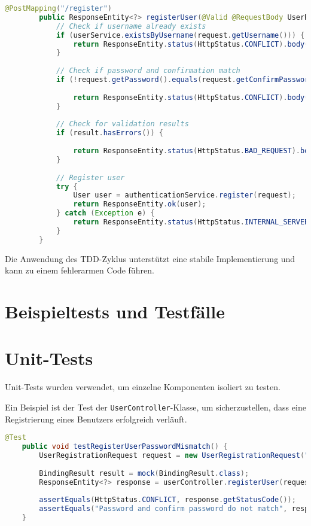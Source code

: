 \begin{enumerate}
	\begin{lstlisting}[language=Java]
		@PostMapping("/register")
		public ResponseEntity<?> registerUser(@Valid @RequestBody UserRegistrationRequest request, BindingResult result) {
			// Check if username already exists
			if (userService.existsByUsername(request.getUsername())) {
				return ResponseEntity.status(HttpStatus.CONFLICT).body("Username already exists");
			}
			
			// Check if password and confirmation match
			if (!request.getPassword().equals(request.getConfirmPassword())) {
				
				return ResponseEntity.status(HttpStatus.CONFLICT).body("Password and confirm password do not match");
			}
			
			// Check for validation results
			if (result.hasErrors()) {
				
				return ResponseEntity.status(HttpStatus.BAD_REQUEST).body("Validation error: " + result.getAllErrors());
			}
			
			// Register user
			try {
				User user = authenticationService.register(request);
				return ResponseEntity.ok(user);
			} catch (Exception e) {
				return ResponseEntity.status(HttpStatus.INTERNAL_SERVER_ERROR).body("Error registering user");
			}
		}
	\end{lstlisting}
	
\end{enumerate}

Die Anwendung des TDD-Zyklus unterstützt eine stabile Implementierung und kann zu einem fehlerarmen Code führen.

\section{Beispieltests und Testfälle}

\section{Unit-Tests}

Unit-Tests wurden verwendet, um einzelne Komponenten isoliert zu testen. 

Ein Beispiel ist der Test der \texttt{UserController}-Klasse, um sicherzustellen, dass eine Registrierung eines Benutzers erfolgreich verläuft.

\begin{lstlisting}[language=Java]
	@Test
	public void testRegisterUserPasswordMismatch() {
		UserRegistrationRequest request = new UserRegistrationRequest("testuser", "password1", "password2");
		
		BindingResult result = mock(BindingResult.class);
		ResponseEntity<?> response = userController.registerUser(request, result);
		
		assertEquals(HttpStatus.CONFLICT, response.getStatusCode());
		assertEquals("Password and confirm password do not match", response.getBody());
	}
\end{lstlisting}

